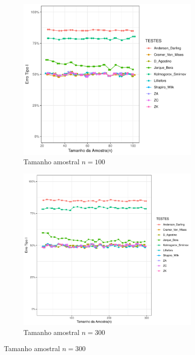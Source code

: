 \documentclass[a4paper,11pt]{article} %
\begin{document}
\begin{figure}[H]
    \vspace{0.5cm} %
    \begin{subfigure}[b]{0.45\textwidth}
        \centering
        \includegraphics[width=\textwidth]{Distribuição Normal/Erro Tipo I/erro_tipo_i_normal_100.pdf}
        \caption{Tamanho amostral \(n = 100\)}
        \label{fig:normal_100}
    \end{subfigure}
    \hfill
    \begin{subfigure}[b]{0.45\textwidth}
        \centering
        \includegraphics[width=\textwidth]{Distribuição Normal/Erro Tipo I/erro_tipo_I_normal_300.pdf}
        \caption{Tamanho amostral \(n = 300\)}
        \label{fig:normal_300}
    \end{subfigure}
    

\end{figure}
\end{document}
